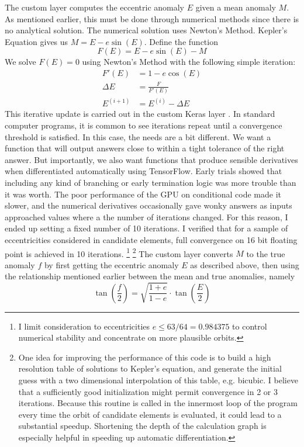 The custom layer  computes the eccentric anomaly $E$ given a mean anomaly $M$.
As mentioned earlier, this must be done through numerical methods since there is no analytical solution.
The numerical solution uses Newton's Method.
Kepler's Equation gives us $M = E - e \sin(E)$.
Define the function
$$F(E) = E - e \sin(E) - M$$
We solve $F(E) = 0 $ using Newton's Method with the following simple iteration:
\begin{align*}
F'(E) &= 1 - e \cos(E) \\
\Delta E &= \frac{F}{F'(E)} \\
E^{(i+1)} &= E^{(i)} - \Delta E
\end{align*}
This iterative update is carried out in the custom Keras layer .
In standard computer programs, it is common to see iterations repeat until a convergence threshold is satisfied.
In this case, the needs are a bit different.
We want a function that will output answers close to within a tight tolerance of the right answer.
But importantly, we also want functions that produce sensible derivatives when differentiated automatically using TensorFlow.
Early trials showed that including any kind of branching or early termination logic was more trouble than it was worth.
The poor performance of the GPU on conditional code made it slower, 
and the numerical derivatives occasionally gave wonky answers as inputs approached values where a the number of iterations changed.
For this reason, I ended up setting a fixed number of 10 iterations.
I verified that for a sample of eccentricities considered in candidate elements, full convergence on 16 bit floating point is achieved in 10 iterations.
\footnote{I limit consideration to eccentricities $ e \le 63/64 = 0.984375$ to control numerical stability and concentrate on more plausible orbits.}
\footnote{One idea for improving the performance of this code is to build a high resolution table of solutions to Kepler's equation,
and generate the initial guess with a two dimensional interpolation of this table, e.g. bicubic.
I believe that a sufficiently good initialization might permit convergence in 2 or 3 iterations.
Because this routine is called in the innermost loop of the program every time the orbit of candidate elements is evaluated,
it could lead to a substantial speedup.
Shortening the depth of the calculation graph is especially helpful in speeding up automatic differentiation.}
The custom layer  converts $M$ to the true anomaly $f$ by first getting the eccentric anomaly $E$
as described above, then using the relationship mentioned earlier between the mean and true anomalies, namely
$$ \tan \left(\frac{f}{2} \right) = \sqrt{\frac{1+e}{1-e}} \cdot \tan \left( \frac{E}{2} \right)$$

